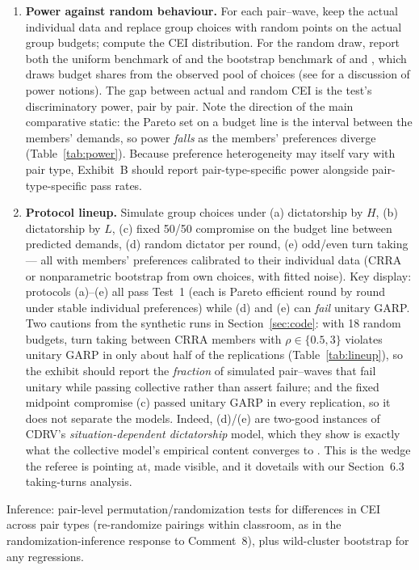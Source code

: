 \documentclass[11pt]{article}
\theoremstyle{remark}
\begin{document}
\begin{enumerate}[leftmargin=1.6em]
\item \textbf{Power against random behaviour.} For each pair--wave, keep the actual individual data and replace group choices with random points on the actual group budgets; compute the CEI distribution. For the random draw, report both the uniform benchmark of \citet{bronars1987} and the bootstrap benchmark of \citet{harbaugh2001} and \citet{andreonimiller2002}, which draws budget shares from the observed pool of choices (see \citealp{andreoniharbaugh2006} for a discussion of power notions). The gap between actual and random CEI is the test's discriminatory power, pair by pair. Note the direction of the main comparative static: the Pareto set on a budget line is the interval between the members' demands, so power \emph{falls} as the members' preferences diverge (Table~\ref{tab:power}). Because preference heterogeneity may itself vary with pair type, Exhibit~B should report pair-type-specific power alongside pair-type-specific pass rates.
\item \textbf{Protocol lineup.} Simulate group choices under (a) dictatorship by $H$, (b) dictatorship by $L$, (c) fixed 50/50 compromise on the budget line between predicted demands, (d) random dictator per round, (e) odd/even turn taking --- all with members' preferences calibrated to their individual data (CRRA or nonparametric bootstrap from own choices, with fitted noise). Key display: protocols (a)--(e) all pass Test~1 (each is Pareto efficient round by round under stable individual preferences) while (d) and (e) can \emph{fail} unitary GARP. Two cautions from the synthetic runs in Section~\ref{sec:code}: with 18 random budgets, turn taking between CRRA members with $\rho\in\{0.5,3\}$ violates unitary GARP in only about half of the replications (Table~\ref{tab:lineup}), so the exhibit should report the \emph{fraction} of simulated pair--waves that fail unitary while passing collective rather than assert failure; and the fixed midpoint compromise (c) passed unitary GARP in every replication, so it does not separate the models. Indeed, (d)/(e) are two-good instances of CDRV's \emph{situation-dependent dictatorship} model, which they show is exactly what the collective model's empirical content converges to \citep[Sec.~4]{cherchye2007}. This is the wedge the referee is pointing at, made visible, and it dovetails with our Section~6.3 taking-turns analysis.
\end{enumerate}

Inference: pair-level permutation/randomization tests for differences in CEI across pair types (re-randomize pairings within classroom, as in the randomization-inference response to Comment~8), plus wild-cluster bootstrap for any regressions.
\end{document}
